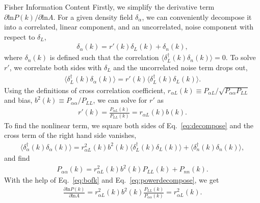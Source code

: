 \begin{section}{Fisher Information Content}
  Firstly, we simplify the derivative term
  $\partial \mathrm{ln} P(k)/\partial\mathrm{ln} A$.  For a given density field $\delta_\alpha$, we can
  conveniently decompose it into a correlated, linear component,
  and an uncorrelated, noise component with respect to $\delta_L$, 
  \begin{align}
    \delta_{\alpha}(k) = r'(k) \delta_L (k) + \delta_{n}(k),
    \label{eq:decompose}
  \end{align}
  where $\delta_{n}(k)$ is defined such that the correlation
  $\langle \delta_L^\dagger(k)\delta_{n}(k) \rangle=0$.  To solve $r'$, we correlate
  both sides with $\delta_L$ and the uncorrelated noise term drops out,
  \begin{align}
    \langle \delta_L^\dagger(k)\delta_\alpha(k) \rangle = r'(k) \langle \delta_L^\dagger(k)\delta_L(k) \rangle.
    \label{eq:correlating}
  \end{align} 
  Using the definitions of cross correlation coefficient, $r_{\alpha L}(k)\equiv P_{\alpha L}/\sqrt{P_{\alpha\alpha}P_{LL}}$ 
  and bias, $b^2(k)\equiv P_{\alpha\alpha}/P_{LL}$, we can solve for $r'$ as
  \begin{align}
    r'(k) = \frac{P_{\alpha L}(k)}{P_{LL}(k)}=r_{\alpha L}(k) b(k).
    \label{eq:bofk}                                              
  \end{align}                                                    
  To find the nonlinear term, we square both sides of Eq.~\ref{eq:decompose}
  and the cross term of the right hand side vanishes,             
  \begin{align}                                                  
    \langle \delta_\alpha^\dagger(k) \delta_\alpha(k) \rangle =  
    r_{\alpha L}^2(k)b^2(k) \langle \delta_L^\dagger(k) \delta_L(k) \rangle + 
    \langle \delta_{n}^\dagger(k)\delta_{n}(k) \rangle,          
  \end{align}                                                    
  and find                                                       
  \begin{align}                                                  
    P_{\alpha\alpha}(k) = r_{\alpha L}^2(k)b^2(k)P_{LL}(k) + P_{nn}(k).
    \label{eq:powerdecompose}                                    
  \end{align}                                                    
  With the help of Eq.~\ref{eq:bofk} and Eq.~\ref{eq:powerdecompose},
  we get                                                         
  \begin{align}                                                  
    \frac{\partial \mathrm{ln} P(k) }{ \partial \mathrm{ln} A}=
    r^2_{\alpha L}(k)b^2(k)\frac{P_{LL}(k)}{P_{\alpha\alpha}(k)}=r^2_{\alpha L}(k).
  \end{align}


\end{section}
